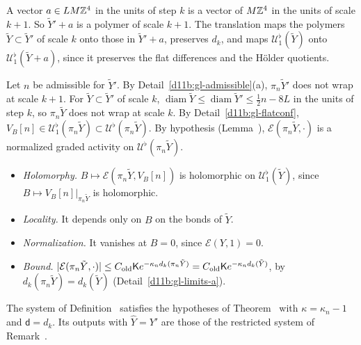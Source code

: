 \begin{step}[Translations]
A vector $a\in LM\mathbb Z^4$ in the units of step $k$ is a vector of $M\mathbb Z^4$ in the units of scale $k+1$. So $\tilde Y'+a$ is a polymer of scale $k+1$. The translation maps the polymers $\tilde Y\subset\tilde Y'$ of scale $k$ onto those in $\tilde Y'+a$, preserves $d_k$, and maps $\mathcal U^\flat_1(\tilde Y)$ onto $\mathcal U^\flat_1(\tilde Y+a)$, since it preserves the flat differences and the Hölder quotients.
\end{step}

\begin{step}
Let $n$ be admissible for $\tilde Y'$. By Detail~\ref{d11b:gl-admissible}(a), $\pi_n\tilde Y'$ does not wrap at scale $k+1$. For $\tilde Y\subset\tilde Y'$ of scale $k$, $\operatorname{diam}\tilde Y\le\operatorname{diam}\tilde Y'\le\frac12n-8L$ in the units of step $k$, so $\pi_n\tilde Y$ does not wrap at scale $k$. By Detail~\ref{d11b:gl-flatconf}, $V_B[n]\in\mathcal U^\flat_1(\pi_n\tilde Y)\subset\mathcal U^\flat(\pi_n\tilde Y)$. By hypothesis (Lemma~), $\mathcal E(\pi_n\tilde Y,\cdot)$ is a normalized graded activity on $\mathcal U^\flat(\pi_n\tilde Y)$.
\begin{itemize}
\item \emph{Holomorphy.} $B\mapsto\mathcal E(\pi_n\tilde Y,V_B[n])$ is holomorphic on $\mathcal U^\flat_1(\tilde Y)$, since $B\mapsto V_B[n]|_{\pi_n\tilde Y}$ is holomorphic.
\item \emph{Locality.} It depends only on $B$ on the bonds of $\tilde Y$.
\item \emph{Normalization.} It vanishes at $B=0$, since $\mathcal E(Y,1)=0$.
\item \emph{Bound.} $|\mathcal E(\pi_n\tilde Y,\cdot)|\le C_{\rm old}\mathsf Ke^{-\kappa_nd_k(\pi_n\tilde Y)}=C_{\rm old}\mathsf Ke^{-\kappa_nd_k(\tilde Y)}$, by $d_k(\pi_n\tilde Y)=d_k(\tilde Y)$ (Detail~\ref{d11b:gl-limits-a}).
\end{itemize}
\end{step}

\begin{detail}\label{d11b:gl-defined}
The system of Definition~ satisfies the hypotheses of Theorem~ with $\kappa=\kappa_n-1$ and $\mathsf d=d_k$. Its outputs with $\hat Y=Y'$ are those of the restricted system of Remark~.
\end{detail}

